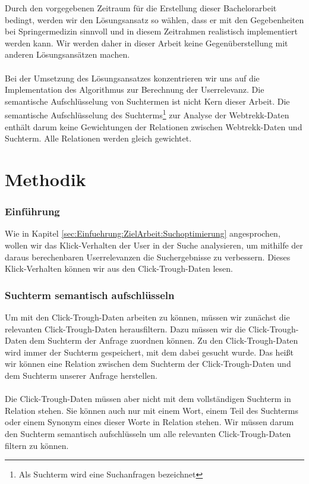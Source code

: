 Durch den vorgegebenen Zeitraum für die Erstellung dieser Bachelorarbeit bedingt, werden wir den Lösungsansatz so wählen, dass er mit den Gegebenheiten bei Springermedizin sinnvoll und in diesem Zeitrahmen realistisch implementiert werden kann. Wir werden daher in dieser Arbeit keine Gegenüberstellung mit anderen Lösungsansätzen machen. 
\\
\\
Bei der Umsetzung des Lösungsansatzes konzentrieren wir uns auf die Implementation des Algorithmus zur Berechnung der Userrelevanz. Die semantische Aufschlüsselung von Suchtermen ist nicht Kern dieser Arbeit. Die semantische Aufschlüsselung des Suchterms\footnote{Als Suchterm wird eine Suchanfragen bezeichnet} zur Analyse der Webtrekk-Daten enthält darum keine Gewichtungen der Relationen zwischen Webtrekk-Daten und Suchterm. Alle Relationen werden gleich gewichtet. 


\section{Methodik}
\label{sec:Einfuehrung:Methodik}

\subsubsection{Einführung}
\label{sec:Einfuehrung:Methodik:Einfuehrung}

Wie in Kapitel \ref{sec:Einfuehrung:ZielArbeit:Suchoptimierung} angesprochen, wollen wir das Klick-Verhalten der User in der Suche analysieren, um mithilfe der daraus berechenbaren Userrelevanzen die Suchergebnisse zu verbessern. Dieses Klick-Verhalten können wir aus den Click-Trough-Daten lesen. 

\subsubsection{Suchterm semantisch aufschlüsseln}
\label{sec:Einfuehrung:Methodik:SuchtermSegmentierung}

Um mit den Click-Trough-Daten arbeiten zu können, müssen wir zunächst die relevanten Click-Trough-Daten herausfiltern. Dazu müssen wir die Click-Trough-Daten dem Suchterm der Anfrage zuordnen können. Zu den Click-Trough-Daten wird immer der Suchterm gespeichert, mit dem dabei gesucht wurde. Das heißt wir können eine Relation zwischen dem Suchterm der Click-Trough-Daten und dem Suchterm unserer Anfrage herstellen.
\\
\\
Die Click-Trough-Daten müssen aber nicht mit dem vollständigen Suchterm in Relation stehen. Sie können auch nur mit einem Wort, einem Teil des Suchterms oder einem Synonym eines dieser Worte in Relation stehen. Wir müssen darum den Suchterm semantisch aufschlüsseln um alle relevanten Click-Trough-Daten filtern zu können. 

